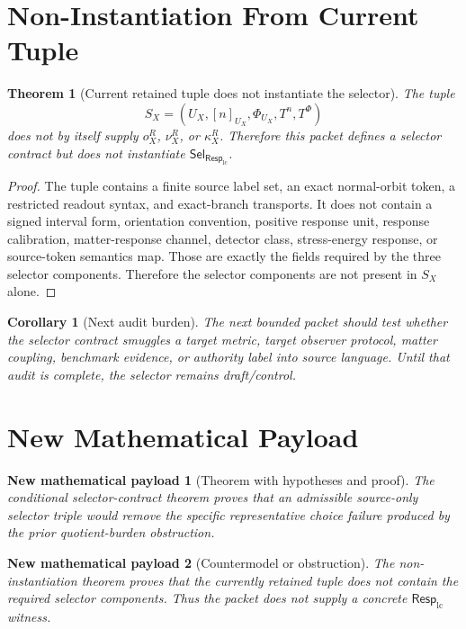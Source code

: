 \documentclass[11pt]{article}
\newcommand{\RespLC}{\mathsf{Resp}_{\mathrm{lc}}}
\newcommand{\SelResp}{\mathsf{Sel}_{\RespLC}}
\newtheorem{theorem}{Theorem}
\newtheorem{corollary}{Corollary}
\newtheorem{payload}{New mathematical payload}
\begin{document}
\section{Non-Instantiation From Current Tuple}

\begin{theorem}[Current retained tuple does not instantiate the selector]
The tuple
\[
    S_X=(U_X,[n]_{U_X},\Phi_{U_X},T^n,T^\Phi)
\]
does not by itself supply \(o^R_X\), \(\nu^R_X\), or \(\kappa^R_X\).
Therefore this packet defines a selector contract but does not
instantiate \(\SelResp\).
\end{theorem}

\begin{proof}
The tuple contains a finite source label set, an exact normal-orbit
token, a restricted readout syntax, and exact-branch transports. It
does not contain a signed interval form, orientation convention,
positive response unit, response calibration, matter-response channel,
detector class, stress-energy response, or source-token semantics map.
Those are exactly the fields required by the three selector components.
Therefore the selector components are not present in \(S_X\) alone.
\end{proof}

\begin{corollary}[Next audit burden]
The next bounded packet should test whether the selector contract
smuggles a target metric, target observer protocol, matter coupling,
benchmark evidence, or authority label into source language. Until
that audit is complete, the selector remains draft/control.
\end{corollary}

\section{New Mathematical Payload}

\begin{payload}[Theorem with hypotheses and proof]
The conditional selector-contract theorem proves that an admissible
source-only selector triple would remove the specific representative
choice failure produced by the prior quotient-burden obstruction.
\end{payload}

\begin{payload}[Countermodel or obstruction]
The non-instantiation theorem proves that the currently retained tuple
does not contain the required selector components. Thus the packet does
not supply a concrete \(\RespLC\) witness.
\end{payload}
\end{document}

